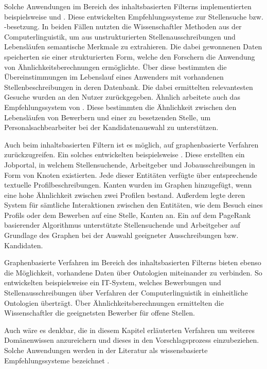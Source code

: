 Solche Anwendungen im Bereich des inhaltsbasierten Filterns implementierten beispielsweise \textcite[S. 4ff.]{guo:2016} und \textcite[S. 3ff.]{prospect:2010}. Diese entwickelten Empfehlungssysteme zur Stellensuche bzw. -besetzung. In beiden Fällen nutzten die Wissenschaftler Methoden aus der Computerlinguistik, um aus unstrukturierten Stellenausschreibungen und Lebensläufen semantische Merkmale zu extrahieren. Die dabei gewonnenen Daten speicherten sie einer strukturierten Form, welche den Forschern die Anwendung von Ähnlichkeitsberechnungen ermöglichte. Über diese bestimmten \textcite[S. 4ff.]{guo:2016} die Übereinstimmungen im Lebenslauf eines Anwenders mit vorhandenen Stellenbeschreibungen in deren Datenbank. Die dabei ermittelten relevantesten Gesuche wurden an den Nutzer zurückgegeben. Ähnlich arbeitete auch das Empfehlungssystem von \textcite[S. 3ff.]{prospect:2010}. Diese bestimmten die Ähnlichkeit zwischen den Lebensläufen von Bewerbern und einer zu besetzenden Stelle, um Personalsachbearbeiter bei der Kandidatenauswahl zu unterstützen.

Auch beim inhaltsbasierten Filtern ist es möglich, auf graphenbasierte Verfahren zurückzugreifen. Ein solches entwickelten beispielsweise \textcite[S. 1ff.]{lu:2013}. Diese erstellten ein Jobportal, in welchem Stellensuchende, Arbeitgeber und Jobausschreibungen in Form von Knoten existierten. Jede dieser Entitäten verfügte über entsprechende textuelle Profilbeschreibungen. Kanten wurden im Graphen hinzugefügt, wenn eine hohe Ähnlichkeit zwischen zwei Profilen bestand. Außerdem legte deren System für sämtliche Interaktionen zwischen den Entitäten, wie dem Besuch eines Profils oder dem Bewerben auf eine Stelle, Kanten an. Ein auf dem PageRank basierender Algorithmus unterstützte Stellensuchende und Arbeitgeber auf Grundlage des Graphen bei der Auswahl geeigneter Ausschreibungen bzw. Kandidaten.

Graphenbasierte Verfahren im Bereich des inhaltsbasierten Filterns bieten ebenso die Möglichkeit, vorhandene Daten über Ontologien miteinander zu verbinden. So entwickelten beispielsweise \textcite[S. 1ff.]{kumaran:2013} ein IT-System, welches Bewerbungen und Stellenausschreibungen über Verfahren der Computerlinguistik in einheitliche Ontologien überträgt. Über Ähnlichkeitsberechnungen ermittelten die Wissenschaftler die geeignetsten Bewerber für offene Stellen.

Auch wäre es denkbar, die in diesem Kapitel erläuterten Verfahren um weiteres Domänenwissen anzureichern und dieses in den Vorschlagsprozess einzubeziehen. Solche Anwendungen werden in der Literatur als wissensbasierte Empfehlungssysteme bezeichnet \cite[S. 168f.]{recommenderSystems:2016}.

